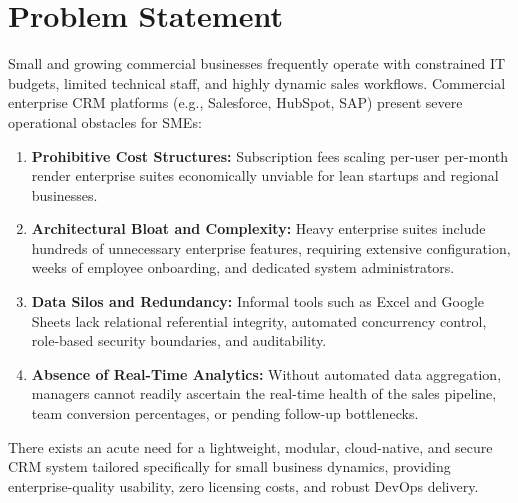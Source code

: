 \section{Problem Statement}
Small and growing commercial businesses frequently operate with constrained IT budgets, limited technical staff, and highly dynamic sales workflows. Commercial enterprise CRM platforms (e.g., Salesforce, HubSpot, SAP) present severe operational obstacles for SMEs:
\begin{enumerate}[label=(\alph*)]
    \item \textbf{Prohibitive Cost Structures:} Subscription fees scaling per-user per-month render enterprise suites economically unviable for lean startups and regional businesses.
    \item \textbf{Architectural Bloat and Complexity:} Heavy enterprise suites include hundreds of unnecessary enterprise features, requiring extensive configuration, weeks of employee onboarding, and dedicated system administrators.
    \item \textbf{Data Silos and Redundancy:} Informal tools such as Excel and Google Sheets lack relational referential integrity, automated concurrency control, role-based security boundaries, and auditability.
    \item \textbf{Absence of Real-Time Analytics:} Without automated data aggregation, managers cannot readily ascertain the real-time health of the sales pipeline, team conversion percentages, or pending follow-up bottlenecks.
\end{enumerate}
There exists an acute need for a lightweight, modular, cloud-native, and secure CRM system tailored specifically for small business dynamics, providing enterprise-quality usability, zero licensing costs, and robust DevOps delivery.

